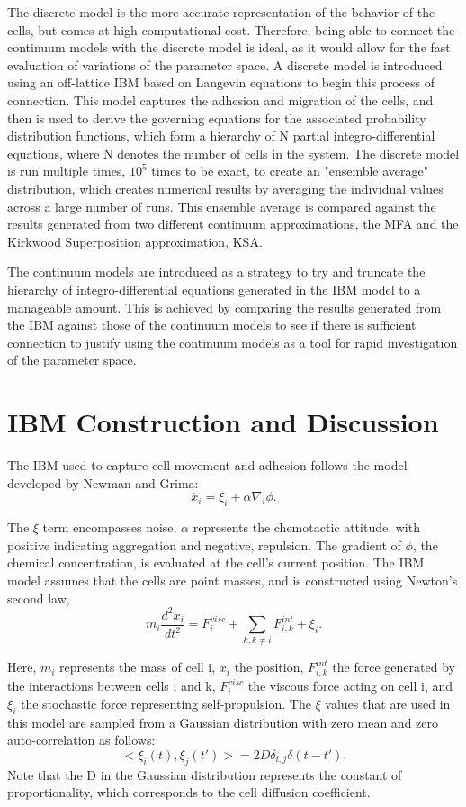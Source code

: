 \documentclass[12pt,letterpaper,cm]{article}
\renewcommand{\.}{\cdot}
\newcommand{\<}{\langle}
\renewcommand{\>}{\rangle}
\begin{document}
	\indent 
	
	The discrete model is the more accurate representation of the behavior of the cells, but comes at high computational cost.  Therefore, being able to connect the continuum models with the discrete model is ideal, as it would allow for the fast evaluation of variations of the parameter space.  A discrete model is introduced using an off-lattice IBM based on Langevin equations to begin this process of connection.  This model captures the adhesion and migration of the cells, and then is used to derive the governing equations for the associated probability distribution functions, which form a hierarchy of N partial integro-differential equations, where N denotes the number of cells in the system.  The discrete model is run multiple times, $10^5$ times to be exact, to create an "ensemble average" distribution, which creates numerical results by averaging the individual values across a large number of runs.  This ensemble average is compared against the results generated from two different continuum approximations, the MFA and the Kirkwood Superposition approximation, KSA.
	
	The continuum models are introduced as a strategy to try and truncate the hierarchy of integro-differential equations generated in the IBM model to a manageable amount.  This is achieved by comparing the results generated from the IBM against those of the continuum models to see if there is sufficient connection to justify using the continuum models as a tool for rapid investigation of the parameter space.  
	
	\section{IBM Construction and Discussion}
	
	\indent 
	
	The IBM used to capture cell movement and adhesion follows the model developed by Newman and Grima: 
	\[\dot{x_i} = \xi_i + \alpha \nabla_i \phi.\]  
	
	The $\xi$ term encompasses noise, $\alpha$ represents the chemotactic attitude, with positive indicating aggregation and negative, repulsion. The gradient of $\phi$, the chemical concentration, is evaluated at the cell's current position.  The IBM model assumes that the cells are point masses, and is constructed using Newton's second law, 
	\[m_i \frac{d^{2}x_{i}}{dt^2}=F^{visc}_i+\sum_{k,k\neq i}F^{int}_{i,k}+\xi_i.\]
	
	Here, $m_i$ represents the mass of cell i, $x_i$ the position, $F^{int}_{i,k}$ the force generated by the interactions between cells i and k, $F^{visc}_i$ the viscous force acting on cell i, and $\xi_i$ the stochastic force representing self-propulsion.  The $\xi$ values that are used in this model are sampled from a Gaussian distribution with zero mean and zero auto-correlation as follows:
	\[
	<\xi_i(t),\xi_j(t')>=2D\delta_{i,j}\delta(t-t').
	\] 
	Note that the D in the Gaussian distribution represents the constant of proportionality, which corresponds to the cell diffusion coefficient.

	
	\printbibliography
	
	
	
\end{document}
